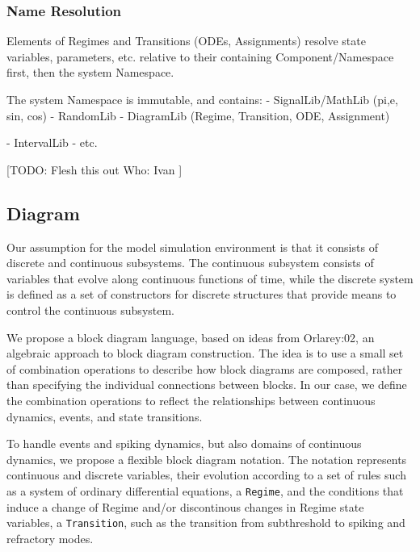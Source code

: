 \documentclass[a4paper]{article}
\newcommand\nmlClass[1]{{\tt #1}}
\begin{document}
\subsubsection{Name Resolution}

Elements of Regimes and Transitions (ODEs, Assignments) resolve state
variables, parameters, etc. relative to their containing
Component/Namespace first, then the system Namespace.

The system Namespace is immutable, and contains:
- SignalLib/MathLib (pi,e, sin, cos)
- RandomLib
- DiagramLib (Regime, Transition, ODE, Assignment)

- IntervalLib
- etc.

[TODO:
Flesh this out
Who: Ivan
]




\subsection{Diagram}

Our assumption for the model simulation environment is that it
consists of discrete and continuous subsystems. The continuous
subsystem consists of variables that evolve along continuous functions
of time, while the discrete system is defined as a set of constructors
for discrete structures that provide means to control the continuous
subsystem. 

We propose a block diagram language, based on ideas from
Orlarey:02, an algebraic approach to block diagram
construction. The idea is to use a small set of combination operations
to describe how block diagrams are composed, rather than specifying
the individual connections between blocks. In our case, we define the
combination operations to reflect the relationships between continuous
dynamics, events, and state transitions.


To handle events and spiking dynamics, but also domains of continuous
dynamics, we propose a flexible block diagram notation.  The notation
represents continuous and discrete variables, their evolution
according to a set of rules such as a system of ordinary differential
equations, a \nmlClass{Regime}, and the conditions that induce a change of
Regime and/or discontinous changes in Regime state variables, a
\nmlClass{Transition}, such as the transition from subthreshold to
spiking and refractory modes.

\end{document}

